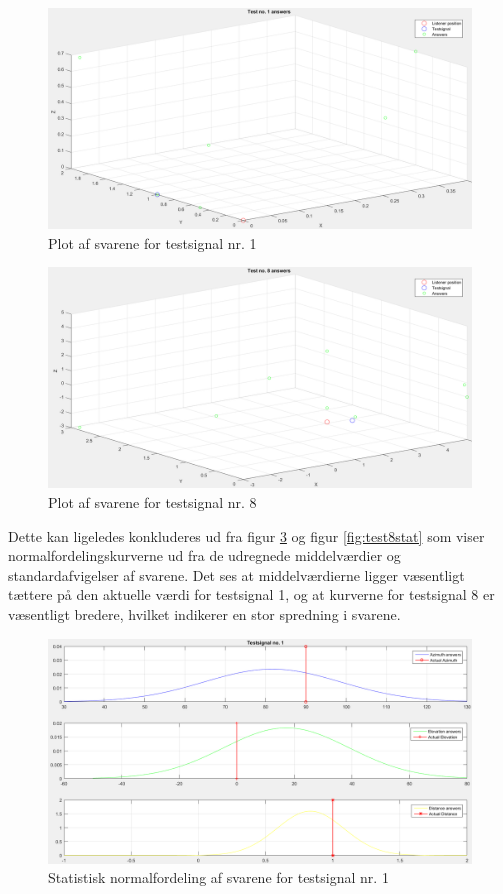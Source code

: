 \begin{figure}[h]
	\centering
	\includegraphics[width=1\linewidth]{All_Pics/test1plot}
	\caption{Plot af svarene for testsignal nr. 1}
	\label{fig:test1plot}
\end{figure}

\begin{figure}[h]
	\centering
	\includegraphics[width=1\linewidth]{All_Pics/test8plot}
	\caption{Plot af svarene for testsignal nr. 8}
	\label{fig:test8plot}
\end{figure}

Dette kan ligeledes konkluderes ud fra figur \ref{fig:test1stat} og figur \ref{fig:test8stat} som viser normalfordelingskurverne ud fra de udregnede middelværdier og standardafvigelser af svarene. Det ses at middelværdierne ligger væsentligt tættere på den aktuelle værdi for testsignal 1, og at kurverne for testsignal 8 er væsentligt bredere, hvilket indikerer en stor spredning i svarene. 

\begin{figure}[h]
	\centering
	\includegraphics[width=1.1\linewidth]{All_Pics/test1stat}
	\caption{Statistisk normalfordeling af svarene for testsignal nr. 1}
	\label{fig:test1stat}
\end{figure}

